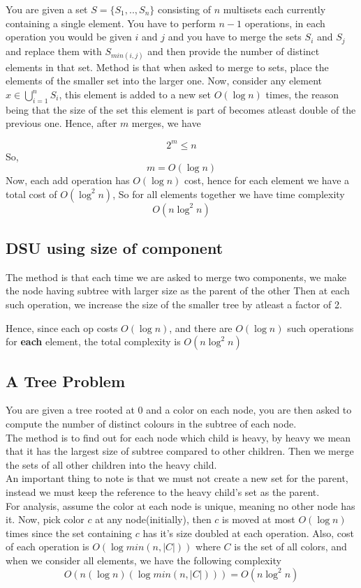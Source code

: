 \documentclass{article}
\begin{document}
    You are given a set $S = \{S_1, .., S_n\}$ consisting of $n$ multisets
    each currently containing a single element. You have to perform $n - 1$
    operations, in each operation you would be given $i$ and $j$ and you 
    have to merge the sets $S_i$ and $S_j$ and replace them with $S_{min(i,j)}$
    and then provide the number of distinct elements in that set.
    Method is that when asked to merge to sets, place the elements of the smaller
    set into the larger one.
    Now, consider any element $x \in \bigcup_{i = 1}^{n}S_i$, this element is
    added to a new set $O(\log n)$ times, the reason being that the size of the
    set this element is part of becomes atleast double of the previous one.
    Hence, after $m$ merges, we have

    \[
        2^m \leq n
    \]
    So, 
    \[
        m = O(\log n)
    \]
    Now, each add operation has $O(\log n)$ cost, hence for each element we
    have a total cost of $O(\log^2n)$, So for all elements together we
    have time complexity
    \[
        O(n \log^2n)
    \]

    \subsection{DSU using size of component}

    The method is that each time we are asked to merge two components, we
    make the node having subtree with larger size as the parent of the other
    Then at each such operation, we increase the size of the smaller tree
    by atleast a factor of 2.
    
    Hence, since each op costs $O(\log n)$, and there are $O(\log n)$
    such operations for \textbf{each} element, the total complexity is
    $O(n \log^2n)$

    \subsection{A Tree Problem}

    You are given a tree rooted at $0$ and a color on each node, you
    are then asked to compute the number of distinct colours in the
    subtree of each node. \\
    The method is to find out for each node which child is heavy,
    by heavy we mean that it has the largest size of subtree compared to
    other children. Then we merge the sets of all other children into
    the heavy child. \\
    An important thing to note is that we must not create a new set for the
    parent, instead we must keep the reference to the heavy child's set
    as the parent. \\
    For analysis, assume the color at each node is unique, meaning no other
    node has it. Now, pick color $c$ at any node(initially), then $c$ is moved
    at most $O(\log n)$ times since the set containing $c$ has it's size
    doubled at each operation. Also, cost of each operation is
    $O(\log {min(n, |C|)})$ where $C$ is the set of all colors, and when
    we consider all elements, we have the following complexity
    \[
        O(n (\log n) (\log{min(n, |C|)})) = O(n \log^2n)
    \]
\end{document}
